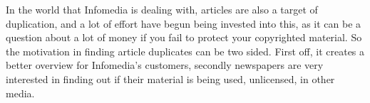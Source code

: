 In the world that Infomedia is dealing with, articles are also a target of duplication, and a lot of effort have begun being invested into this, as it can be a question about a lot of money if you fail to protect your copyrighted material. So the motivation in finding article duplicates can be two sided. First off, it creates a better overview for Infomedia's customers, secondly newspapers are very interested in finding out if their material is being used, unlicensed, in other media.

